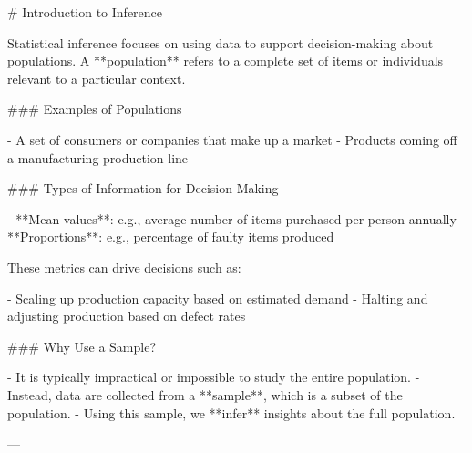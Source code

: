 # Introduction to Inference

Statistical inference focuses on using data to support decision-making about populations. A **population** refers to a complete set of items or individuals relevant to a particular context.

### Examples of Populations

- A set of consumers or companies that make up a market
- Products coming off a manufacturing production line

### Types of Information for Decision-Making

- **Mean values**: e.g., average number of items purchased per person annually
- **Proportions**: e.g., percentage of faulty items produced

These metrics can drive decisions such as:

- Scaling up production capacity based on estimated demand
- Halting and adjusting production based on defect rates

### Why Use a Sample?

- It is typically impractical or impossible to study the entire population.
- Instead, data are collected from a **sample**, which is a subset of the population.
- Using this sample, we **infer** insights about the full population.

---
